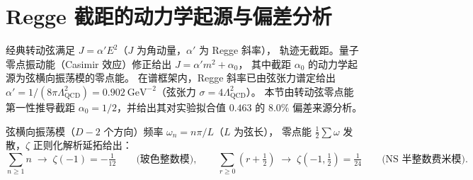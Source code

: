 %

\section{Regge 截距的动力学起源与偏差分析}
\label{sec:regge-intercept}

经典转动弦满足 $J = \alpha'E^2$（$J$ 为角动量，$\alpha'$ 为 Regge 斜率），
轨迹无截距。量子零点振动能（Casimir 效应）修正给出 $J = \alpha'm^2 + \alpha_0$，
其中截距 $\alpha_0$ 的动力学起源为弦横向振荡模的零点能。
在谱框架内，Regge 斜率已由弦张力谱定给出 $\alpha' = 1/(8\pi\Lambda_{\mathrm{QCD}}^2)
= 0.902\ \mathrm{GeV}^{-2}$（弦张力 $\sigma = 4\Lambda_{\mathrm{QCD}}^2$）。
本节由转动弦零点能第一性推导截距 $\alpha_0 = 1/2$，并给出其对实验拟合值
$0.463$ 的 $8.0\%$ 偏差来源分析。

\begin{theorem}
\label{thm:zero-point}
弦横向振荡模（$D-2$ 个方向）频率 $\omega_n = n\pi/L$（$L$ 为弦长），
零点能 $\tfrac{1}{2}\sum\omega$ 发散，$\zeta$ 正则化解析延拓给出：
\begin{equation}
\sum_{n\geq1} n \;\longrightarrow\; \zeta(-1) = -\tfrac{1}{12} \qquad
\text{(玻色整数模)},
\qquad
\sum_{r\geq0} (r+\tfrac{1}{2}) \;\longrightarrow\;
\zeta(-1,\tfrac{1}{2}) = \tfrac{1}{24} \qquad \text{(NS 半整数费米模)}.
\end{equation}
\end{theorem}

